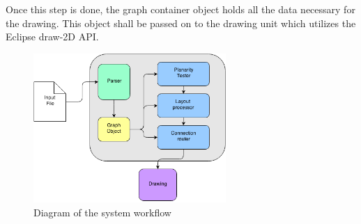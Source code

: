 Once this step is done, the graph container object holds all the data necessary for the drawing. This object shall be passed on 
to the drawing unit which utilizes the Eclipse draw-2D API.

\begin{figure}[ht] \centering
\includegraphics[width=0.65\textwidth]{img/systemarch/systemworkflow.png}
\caption{Diagram of the system workflow} \end{figure}
